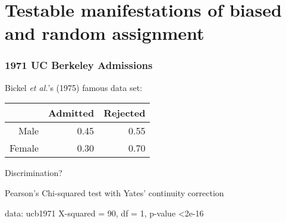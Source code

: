\section[tests of assignment]{Testable manifestations of biased and random assignment}

\begin{frame}[fragile]
  \frametitle{1971 UC Berkeley Admissions}

Bickel \textit{et al.}'s (1975)%
famous data set:\\[1ex]

\begin{tabular}{rrr}
  \hline
 & Admitted & Rejected \\ 
  \hline
Male & 0.45 & 0.55 \\ 
  Female & 0.30 & 0.70 \\ 
   \hline
\end{tabular}
\vspace{2ex}

Discrimination?\\[3ex]

\pause
\begin{Schunk}
\begin{Soutput}
	Pearson's Chi-squared test with Yates'
	continuity correction

data:  ucb1971
X-squared = 90, df = 1, p-value <2e-16
\end{Soutput}
\end{Schunk}
\end{frame}

